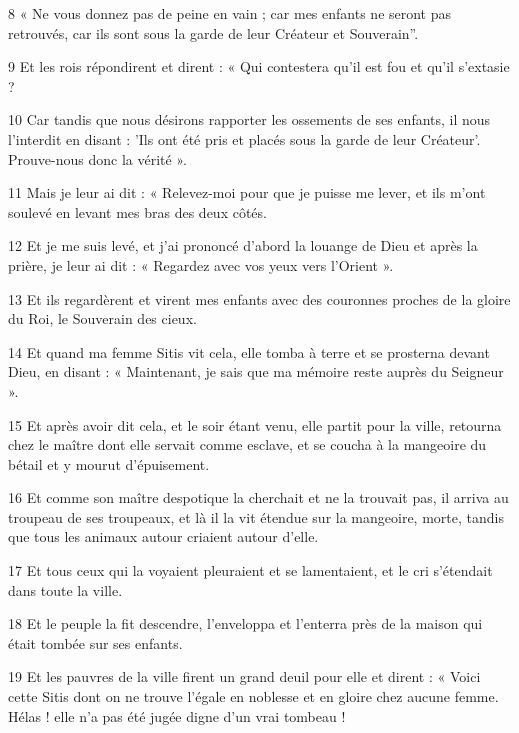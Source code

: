\par 8 « Ne vous donnez pas de peine en vain ; car mes enfants ne seront pas retrouvés, car ils sont sous la garde de leur Créateur et Souverain''.

\par 9 Et les rois répondirent et dirent : « Qui contestera qu'il est fou et qu'il s'extasie ?

\par 10 Car tandis que nous désirons rapporter les ossements de ses enfants, il nous l'interdit en disant : 'Ils ont été pris et placés sous la garde de leur Créateur'. Prouve-nous donc la vérité ».

\par 11 Mais je leur ai dit : « Relevez-moi pour que je puisse me lever, et ils m'ont soulevé en levant mes bras des deux côtés.

\par 12 Et je me suis levé, et j'ai prononcé d'abord la louange de Dieu et après la prière, je leur ai dit : « Regardez avec vos yeux vers l'Orient ».

\par 13 Et ils regardèrent et virent mes enfants avec des couronnes proches de la gloire du Roi, le Souverain des cieux.

\par 14 Et quand ma femme Sitis vit cela, elle tomba à terre et se prosterna devant Dieu, en disant : « Maintenant, je sais que ma mémoire reste auprès du Seigneur ».

\par 15 Et après avoir dit cela, et le soir étant venu, elle partit pour la ville, retourna chez le maître dont elle servait comme esclave, et se coucha à la mangeoire du bétail et y mourut d'épuisement.

\par 16 Et comme son maître despotique la cherchait et ne la trouvait pas, il arriva au troupeau de ses troupeaux, et là il la vit étendue sur la mangeoire, morte, tandis que tous les animaux autour criaient autour d'elle.

\par 17 Et tous ceux qui la voyaient pleuraient et se lamentaient, et le cri s'étendait dans toute la ville.

\par 18 Et le peuple la fit descendre, l'enveloppa et l'enterra près de la maison qui était tombée sur ses enfants.

\par 19 Et les pauvres de la ville firent un grand deuil pour elle et dirent : « Voici cette Sitis dont on ne trouve l'égale en noblesse et en gloire chez aucune femme. Hélas ! elle n’a pas été jugée digne d’un vrai tombeau !

